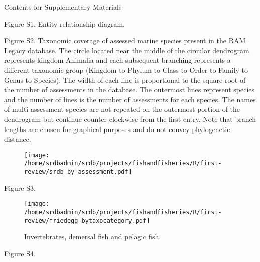 \documentclass[letterpaper,review,authoryear,12pt]{myelsarticle}
\begin{document}
\begin{appendix}
Contents for Supplementary Materials



\begin{landscape}
\begin{tiny}

\end{tiny}
\end{landscape}


\noindent Figure S1. Entity-relationship diagram.

\noindent Figure S2. Taxonomic coverage of assessed marine species present in the
RAM Legacy database. The circle located near the middle of the circular
dendrogram represents kingdom Animalia and each subsequent branching
represents a different taxonomic group (Kingdom to Phylum to Class to
Order to Family to Genus to Species). The width of each line is
proportional to the square root of the number of assessments in the
database. The outermost lines represent species and the number of
lines is the number of assessments for each species. The names of
multi-assessment species are not repeated on the outermost portion of
the dendrogram but continue counter-clockwise from the first entry.
Note that branch lengths are chosen for graphical purposes and do not
convey phylogenetic distance.\\ 

\begin{figure}
\begin{center}
\texttt{[image: /home/srdbadmin/srdb/projects/fishandfisheries/R/first-review/srdb-by-assessment.pdf]} %
\end{center}
\caption{ }\label{fig:taxo:srdb}
\end{figure}


\noindent Figure S3. \\ 

\begin{figure}
\begin{center}
\texttt{[image: /home/srdbadmin/srdb/projects/fishandfisheries/R/first-review/friedegg-bytaxocategory.pdf]}
\end{center}
\caption{Invertebrates, demersal fish and pelagic fish.}
\label{fig:group}
\end{figure}


\noindent Figure S4. \\ 


\end{appendix}
\end{document}
